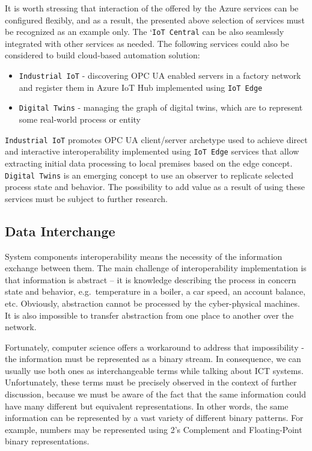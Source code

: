\documentclass[
]{article}
\providecommand{\tightlist}{%
  \setlength{\itemsep}{0pt}\setlength{\parskip}{0pt}}
\begin{document}
It is worth stressing that interaction of the offered by the Azure
services can be configured flexibly, and as a result, the presented
above selection of services must be recognized as an example only. The
`\texttt{IoT\ Central} can be also seamlessly integrated with other
services as needed. The following services could also be considered to
build cloud-based automation solution:

\begin{itemize}
\tightlist
\item
  \texttt{Industrial\ IoT} - discovering OPC UA enabled servers in a
  factory network and register them in Azure IoT Hub implemented using
  \texttt{IoT\ Edge}
\item
  \texttt{Digital\ Twins} - managing the graph of digital twins, which
  are to represent some real-world process or entity
\end{itemize}

\texttt{Industrial\ IoT} promotes OPC UA client/server archetype used to
achieve direct and interactive interoperability implemented using
\texttt{IoT\ Edge} services that allow extracting initial data
processing to local premises based on the edge concept.
\texttt{Digital\ Twins} is an emerging concept to use an observer to
replicate selected process state and behavior. The possibility to add
value as a result of using these services must be subject to further
research.

\hypertarget{data-interchange}{%
\subsection{Data Interchange}\label{data-interchange}}

System components interoperability means the necessity of the
information exchange between them. The main challenge of
interoperability implementation is that information is abstract -- it is
knowledge describing the process in concern state and behavior,
e.g.~temperature in a boiler, a car speed, an account balance, etc.
Obviously, abstraction cannot be processed by the cyber-physical
machines. It is also impossible to transfer abstraction from one place
to another over the network.

Fortunately, computer science offers a workaround to address that
impossibility - the information must be represented as a binary stream.
In consequence, we can usually use both ones as interchangeable terms
while talking about ICT systems. Unfortunately, these terms must be
precisely observed in the context of further discussion, because we must
be aware of the fact that the same information could have many different
but equivalent representations. In other words, the same information can
be represented by a vast variety of different binary patterns. For
example, numbers may be represented using 2's Complement and
Floating-Point binary representations.
\end{document}
